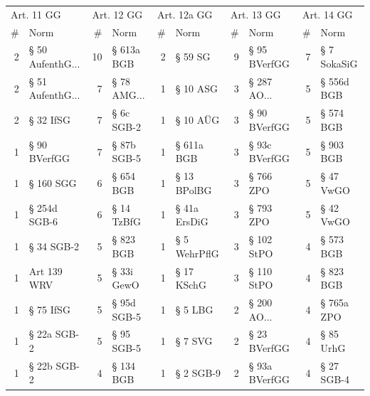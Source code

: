 \begin{tabular}{rlrlrlrlrl}
\toprule
\multicolumn{2}{l}{Art. 11 GG} & \multicolumn{2}{l}{Art. 12 GG} & \multicolumn{2}{l}{Art. 12a GG} & \multicolumn{2}{l}{Art. 13 GG} & \multicolumn{2}{l}{Art. 14 GG} \\
         \# &               Norm &          \# &          Norm &           \# &           Norm &          \# &            Norm &          \# &          Norm \\
\midrule
         2 & § 50 AufenthG... &         10 &    § 613a BGB &           2 &        § 59 SG &          9 &    § 95 BVerfGG &          7 &   § 7 SokaSiG \\
         2 & § 51 AufenthG... &          7 & § 78 AMG... &           1 &       § 10 ASG &          3 &   § 287 AO... &          5 &    § 556d BGB \\
         2 &          § 32 IfSG &          7 &    § 6c SGB-2 &           1 &       § 10 AÜG &          3 &    § 90 BVerfGG &          5 &     § 574 BGB \\
         1 &       § 90 BVerfGG &          7 &   § 87b SGB-5 &           1 &     § 611a BGB &          3 &   § 93c BVerfGG &          5 &     § 903 BGB \\
         1 &          § 160 SGG &          6 &     § 654 BGB &           1 &    § 13 BPolBG &          3 &       § 766 ZPO &          5 &     § 47 VwGO \\
         1 &       § 254d SGB-6 &          6 &    § 14 TzBfG &           1 &   § 41a ErsDiG &          3 &       § 793 ZPO &          5 &     § 42 VwGO \\
         1 &         § 34 SGB-2 &          5 &     § 823 BGB &           1 &   § 5 WehrPflG &          3 &      § 102 StPO &          4 &     § 573 BGB \\
         1 &        Art 139 WRV &          5 &    § 33i GewO &           1 &     § 17 KSchG &          3 &      § 110 StPO &          4 &     § 823 BGB \\
         1 &          § 75 IfSG &          5 &   § 95d SGB-5 &           1 &        § 5 LBG &          2 &   § 200 AO... &          4 &    § 765a ZPO \\
         1 &        § 22a SGB-2 &          5 &    § 95 SGB-5 &           1 &        § 7 SVG &          2 &    § 23 BVerfGG &          4 &     § 85 UrhG \\
         1 &        § 22b SGB-2 &          4 &     § 134 BGB &           1 &      § 2 SGB-9 &          2 &   § 93a BVerfGG &          4 &    § 27 SGB-4 \\

\end{tabular}
